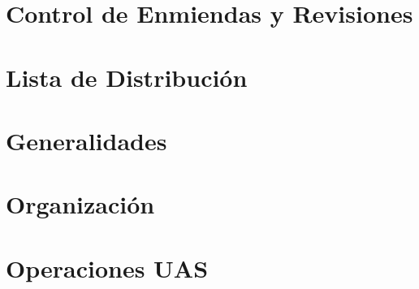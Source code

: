 \documentclass[12pt,openany]{report}
\begin{document}
\chapter*{Control de Enmiendas y Revisiones}



\chapter*{Lista de Distribución}


\label{fin_prelim} %


\clearpage

\justifying
{} %
\setlength{\emergencystretch}{3em} %

\setlength{\parindent}{0pt}





\chapter{Generalidades}
\label{chap:generalidades}

\label{fin_cap1} %


\chapter{Organización}
\label{chap:organizacion}

\label{fin_cap2} %


\chapter{Operaciones UAS}
\label{chap:operaciones}

\label{fin_cap3} %
\end{document}
